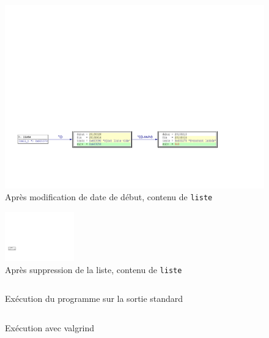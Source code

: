 \begin{figure}[h!]
	\centering
	\includegraphics[width=15cm,clip=true,trim=1cm 4cm 5cm 13cm]{../tests/ddd_graph/modification}
	\caption{Après modification de date de début, contenu de \texttt{liste}}
\end{figure}

\begin{figure}[h!]
	\centering
	\includegraphics[width=3cm,clip=true,trim=1cm 4.5cm 25cm 15cm]{../tests/ddd_graph/suppression}
	\caption{Après suppression de la liste, contenu de \texttt{liste}}
\end{figure}

\begin{figure}[h!]
	\centering
	\inputminted[frame=single,label=Terminal]{text}{../tests/resultat_test_insert}
	\caption{Exécution du programme sur la sortie standard}
\end{figure}

\begin{figure}[h!]
	\centering
	\inputminted[frame=single,label=Terminal]{text}{../tests/valgrind_report}
	\caption{Exécution avec valgrind}
\end{figure}
